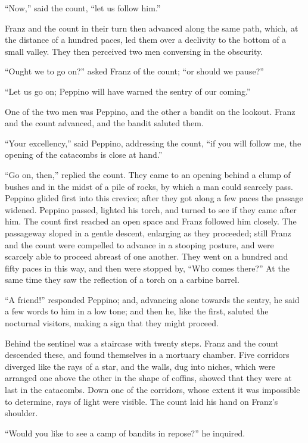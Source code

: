 “Now,” said the count, “let us follow him.”

Franz and the count in their turn then advanced along the same path,
which, at the distance of a hundred paces, led them over a declivity to
the bottom of a small valley. They then perceived two men conversing in
the obscurity.

“Ought we to go on?” asked Franz of the count; “or should we pause?”

“Let us go on; Peppino will have warned the sentry of our coming.”

One of the two men was Peppino, and the other a bandit on the lookout.
Franz and the count advanced, and the bandit saluted them.

“Your excellency,” said Peppino, addressing the count, “if you will
follow me, the opening of the catacombs is close at hand.”

“Go on, then,” replied the count. They came to an opening behind a
clump of bushes and in the midst of a pile of rocks, by which a man
could scarcely pass. Peppino glided first into this crevice; after they
got along a few paces the passage widened. Peppino passed, lighted his
torch, and turned to see if they came after him. The count first
reached an open space and Franz followed him closely. The passageway
sloped in a gentle descent, enlarging as they proceeded; still Franz
and the count were compelled to advance in a stooping posture, and were
scarcely able to proceed abreast of one another. They went on a hundred
and fifty paces in this way, and then were stopped by, “Who comes
there?” At the same time they saw the reflection of a torch on a
carbine barrel.

“A friend!” responded Peppino; and, advancing alone towards the sentry,
he said a few words to him in a low tone; and then he, like the first,
saluted the nocturnal visitors, making a sign that they might proceed.

Behind the sentinel was a staircase with twenty steps. Franz and the
count descended these, and found themselves in a mortuary chamber. Five
corridors diverged like the rays of a star, and the walls, dug into
niches, which were arranged one above the other in the shape of
coffins, showed that they were at last in the catacombs. Down one of
the corridors, whose extent it was impossible to determine, rays of
light were visible. The count laid his hand on Franz’s shoulder.

“Would you like to see a camp of bandits in repose?” he inquired.

